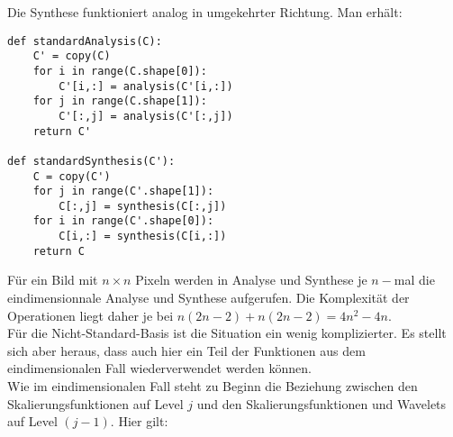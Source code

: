 \documentclass{article}
\begin{document}
%
Die Synthese funktioniert analog in umgekehrter Richtung. Man erhält:
%
\begin{verbatim}
def standardAnalysis(C):
    C' = copy(C)
    for i in range(C.shape[0]):
        C'[i,:] = analysis(C'[i,:])
    for j in range(C.shape[1]):
        C'[:,j] = analysis(C'[:,j])
    return C'

def standardSynthesis(C'):
    C = copy(C')
    for j in range(C'.shape[1]):
        C[:,j] = synthesis(C[:,j])
    for i in range(C'.shape[0]):
        C[i,:] = synthesis(C[i,:])
    return C
\end{verbatim}
%
Für ein Bild mit $n \times n$ Pixeln werden in Analyse und Synthese je $n-$mal die eindimensionnale Analyse und Synthese aufgerufen. Die Komplexität der Operationen liegt daher je bei $n(2n-2) + n(2n-2) = 4n^2-4n$.
\\
Für die Nicht-Standard-Basis ist die Situation ein wenig komplizierter. Es stellt sich aber heraus, dass auch hier ein Teil der Funktionen aus dem eindimensionalen Fall wiederverwendet werden können.\\
Wie im eindimensionalen Fall steht zu Beginn die Beziehung zwischen den Skalierungsfunktionen auf Level $j$ und den Skalierungsfunktionen und Wavelets auf Level $(j-1)$. Hier gilt:
%
%
\end{document}
